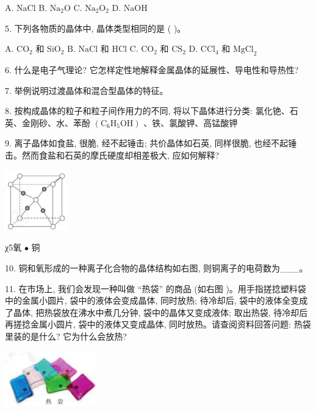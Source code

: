\documentclass[10pt]{article}
\begin{document}
A. \(\mathrm{{NaCl}}\) B. \({\mathrm{{Na}}}_{2}\mathrm{O}\) C. \({\mathrm{{Na}}}_{2}{\mathrm{O}}_{2}\) D. \(\mathrm{{NaOH}}\)

5. 下列各物质的晶体中, 晶体类型相同的是 ( )。

A. \({\mathrm{{CO}}}_{2}\) 和 \({\mathrm{{SiO}}}_{2}\) B. \(\mathrm{{NaCl}}\) 和 \(\mathrm{{HCl}}\) C. \({\mathrm{{CO}}}_{2}\) 和 \({\mathrm{{CS}}}_{2}\) D. \({\mathrm{{CCl}}}_{4}\) 和 \({\mathrm{{MgCl}}}_{2}\)

6. 什么是电子气理论? 它怎样定性地解释金属晶体的延展性、导电性和导热性?

7. 举例说明过渡晶体和混合型晶体的特征。

8. 按构成晶体的粒子和粒子间作用力的不同, 将以下晶体进行分类: 氯化铯、石英、金刚砂、水、苯酚 \(\left( {{\mathrm{C}}_{6}{\mathrm{H}}_{5}\mathrm{{OH}}}\right)\) 、铁、氯酸钾、高锰酸钾

9. 离子晶体如食盐, 很脆, 经不起锤击; 共价晶体如石英, 同样很脆, 也经不起锤击。然而食盐和石英的摩氏硬度却相差极大, 应如何解释?

\begin{center}
\includegraphics[max width=0.2\textwidth]{images/0190e026-5a11-7df7-bd27-54d09026ba7a_97_696374.jpg}
\end{center}

χ5氧 \(\bullet\) 铜

10. 铜和氧形成的一种离子化合物的晶体结构如右图, 则铜离子的电荷数为\_\_\_。

11. 在市场上, 我们会发现一种叫做 “热袋” 的商品 (如右图 )。用手指搓捻塑料袋中的金属小圆片, 袋中的液体会变成晶体, 同时放热; 待冷却后, 袋中的液体全变成了晶体, 把热袋放在沸水中煮几分钟, 袋中的晶体又变成液体; 取出热袋, 待冷却后再搓捻金属小圆片, 袋中的液体又变成晶体, 同时放热。请查阅资料回答问题: 热袋里装的是什么? 它为什么会放热?

\begin{center}
\includegraphics[max width=0.3\textwidth]{images/0190e026-5a11-7df7-bd27-54d09026ba7a_97_812511.jpg}
\end{center}
\end{document}
